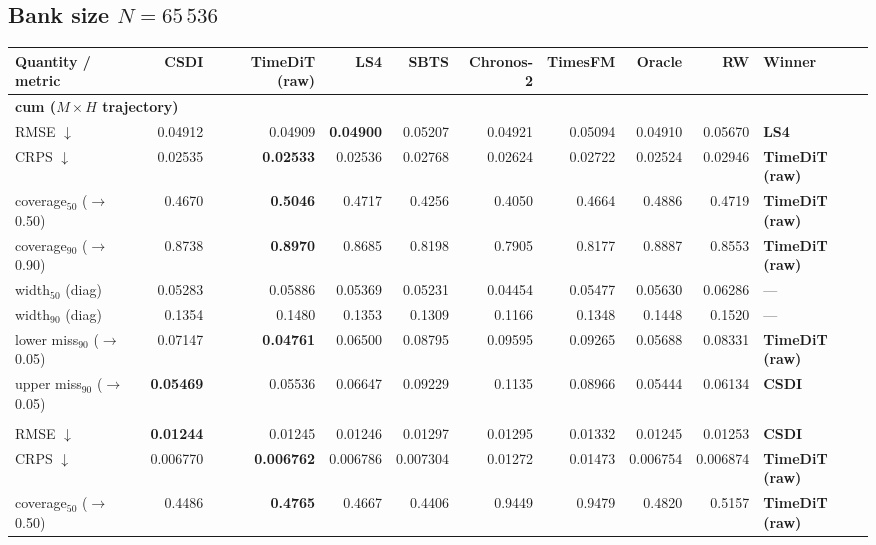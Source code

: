 \documentclass[11pt,a4paper]{article}
\begin{document}
\begin{landscape}
\subsection{Bank size $N = 65\,536$}
\begin{center}\footnotesize
\begin{tabular}{lrrrrrrrrl}
\toprule
Quantity / metric & CSDI & TimeDiT (raw) & LS4 & SBTS & Chronos-2 & TimesFM & Oracle & RW & Winner \\
\midrule
\multicolumn{10}{l}{\textbf{cum ($M\times H$ trajectory)}} \\
RMSE $\downarrow$ & 0.04912 & 0.04909 & \textbf{0.04900} & 0.05207 & 0.04921 & 0.05094 & 0.04910 & 0.05670 & \textbf{LS4} \\
CRPS $\downarrow$ & 0.02535 & \textbf{0.02533} & 0.02536 & 0.02768 & 0.02624 & 0.02722 & 0.02524 & 0.02946 & \textbf{TimeDiT (raw)} \\
coverage$_{50}$ ($\to$0.50) & 0.4670 & \textbf{0.5046} & 0.4717 & 0.4256 & 0.4050 & 0.4664 & 0.4886 & 0.4719 & \textbf{TimeDiT (raw)} \\
coverage$_{90}$ ($\to$0.90) & 0.8738 & \textbf{0.8970} & 0.8685 & 0.8198 & 0.7905 & 0.8177 & 0.8887 & 0.8553 & \textbf{TimeDiT (raw)} \\
width$_{50}$ (diag) & 0.05283 & 0.05886 & 0.05369 & 0.05231 & 0.04454 & 0.05477 & 0.05630 & 0.06286 & --- \\
width$_{90}$ (diag) & 0.1354 & 0.1480 & 0.1353 & 0.1309 & 0.1166 & 0.1348 & 0.1448 & 0.1520 & --- \\
lower miss$_{90}$ ($\to$0.05) & 0.07147 & \textbf{0.04761} & 0.06500 & 0.08795 & 0.09595 & 0.09265 & 0.05688 & 0.08331 & \textbf{TimeDiT (raw)} \\
upper miss$_{90}$ ($\to$0.05) & \textbf{0.05469} & 0.05536 & 0.06647 & 0.09229 & 0.1135 & 0.08966 & 0.05444 & 0.06134 & \textbf{CSDI} \\
\addlinespace
\multicolumn{10}{l}{\textbf{step ($M\times H$)}} \\
RMSE $\downarrow$ & \textbf{0.01244} & 0.01245 & 0.01246 & 0.01297 & 0.01295 & 0.01332 & 0.01245 & 0.01253 & \textbf{CSDI} \\
CRPS $\downarrow$ & 0.006770 & \textbf{0.006762} & 0.006786 & 0.007304 & 0.01272 & 0.01473 & 0.006754 & 0.006874 & \textbf{TimeDiT (raw)} \\
coverage$_{50}$ ($\to$0.50) & 0.4486 & \textbf{0.4765} & 0.4667 & 0.4406 & 0.9449 & 0.9479 & 0.4820 & 0.5157 & \textbf{TimeDiT (raw)} \\

\end{tabular}
\end{center}
\end{landscape}
\end{document}
